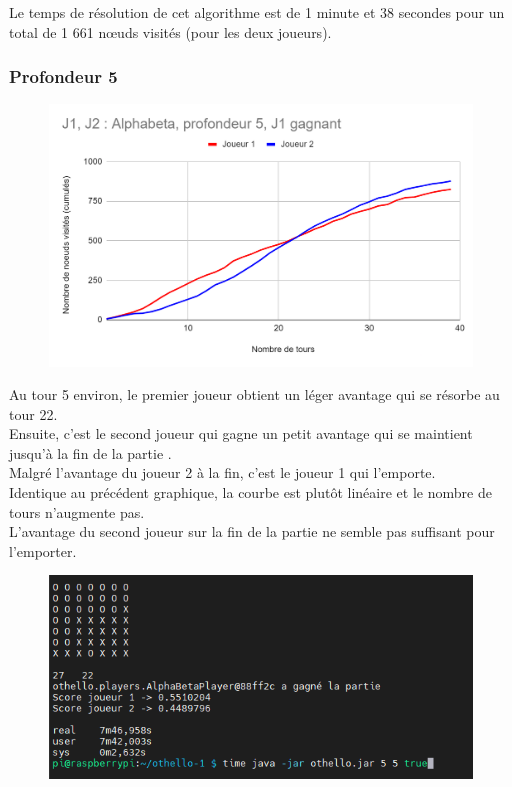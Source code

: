 \documentclass[12pt]{article}
\begin{document}
Le temps de résolution de cet algorithme est de 1 minute et 38 secondes pour un total de 1 661 nœuds visités (pour les deux joueurs).

\newpage
\subsubsection{Profondeur 5}

\begin{figure}[!h]
   \includegraphics[width=\textwidth]{prof5alphabeta.png}
\end{figure}

Au tour 5 environ, le premier joueur obtient un léger avantage qui se résorbe au tour 22.\\
Ensuite, c'est le second joueur qui gagne un petit avantage qui se maintient jusqu'à la fin de la partie .\\
Malgré l'avantage du joueur 2 à la fin, c'est le joueur 1 qui l'emporte.\\

Identique au précédent graphique, la courbe est plutôt linéaire et le nombre de tours n'augmente pas.\\
L'avantage du second joueur sur la fin de la partie ne semble pas suffisant pour l'emporter.
\newpage
\begin{figure}[!h]
   \includegraphics[width=\textwidth]{prof5alphabeta-console.png}
\end{figure}
\end{document}

